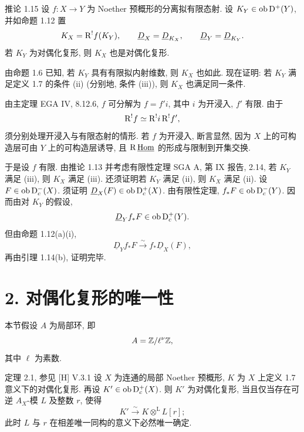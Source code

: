 \begin{statement}{推论 1.15}
设 $f:X\to Y$ 为 Noether 预概形的分离拟有限态射. 设 $K_Y\in\operatorname{ob}\mathrm{D}^+(Y)$, 并如命题 1.12 置
\[
   K_X=\mathrm R^!f(K_Y),\qquad \underline D_X=\underline D_{K_X},\qquad \underline D_Y=\underline D_{K_Y}.
\]
若 $K_Y$ 为对偶化复形, 则 $K_X$ 也是对偶化复形.
\end{statement}

\begin{prooftext}
由命题 1.6 已知, 若 $K_Y$ 具有有限拟内射维数, 则 $K_X$ 也如此. 现在证明: 若 $K_Y$ 满足定义 1.7 的条件 (ii) (分别地, 条件 (iii)), 则 $K_X$ 也满足同一条件.

由主定理 EGA IV, 8.12.6, $f$ 可分解为 $f=f'i$, 其中 $i$ 为开浸入, $f'$ 有限. 由于
\[
   \mathrm R^!f\simeq\mathrm R^!i\,\mathrm R^!f',
\]
须分别处理开浸入与有限态射的情形. 若 $f$ 为开浸入, 断言显然, 因为 $X$ 上的可构造层可由 $Y$ 上的可构造层诱导, 且 $\mathrm R\,\underline{\operatorname{Hom}}$ 的形成与限制到开集交换.

于是设 $f$ 有限. 由推论 1.13 并考虑有限性定理 SGA A, 第 IX 报告, 2.14, 若 $K_Y$ 满足 (iii), 则 $K_X$ 满足 (iii). 还须证明若 $K_Y$ 满足 (ii), 则 $K_X$ 满足 (ii). 设 $F\in\operatorname{ob}\mathrm{D}_c^-(X)$. 须证明 $\underline D_X(F)\in\operatorname{ob}\mathrm{D}_c^+(X)$. 由有限性定理, $f_*F\in\operatorname{ob}\mathrm{D}_c^-(Y)$. 因而由对 $K_Y$ 的假设,
\[
   \underline D_Y f_*F\in\operatorname{ob}\mathrm{D}_c^+(Y).
\]
但由命题 1.12(a)(i),
\[
   \underline D_Y f_*F\xrightarrow{\sim}f_*\underline D_X(F),
\]
再由引理 1.14(b), 证明完毕. \qedtext
\end{prooftext}

\section*{2. 对偶化复形的唯一性}

本节假设 $A$ 为局部环, 即
\[
   A=\mathbb{Z}/\ell^\nu\mathbb{Z},
\]
其中 $\ell$ 为素数.

\begin{statement}{定理 2.1, 参见 [H] V.3.1}
设 $X$ 为连通的局部 Noether 预概形, $K$ 为 $X$ 上定义 1.7 意义下的对偶化复形. 再设 $K'\in\operatorname{ob}\mathrm{D}_c^+(X)$. 则 $K'$ 为对偶化复形, 当且仅当存在可逆 $A_X$-模 $L$ 及整数 $r$, 使得
\[
   K'\xrightarrow{\sim}K\otimes^{\mathrm L}L[r];
\]
此时 $L$ 与 $r$ 在相差唯一同构的意义下必然唯一确定.
\end{statement}

